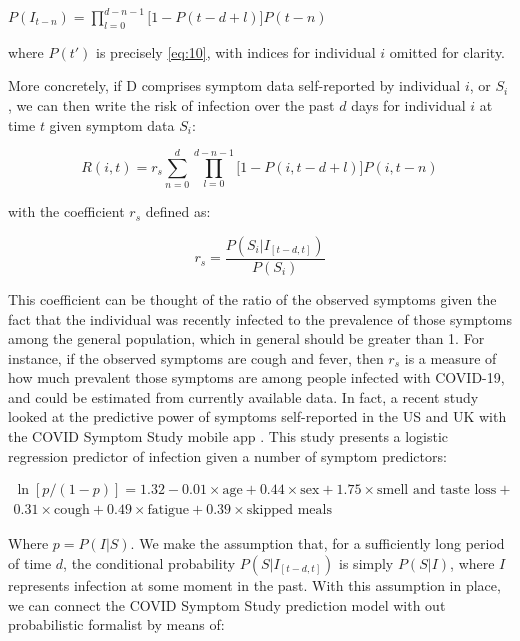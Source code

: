 \documentclass{article}
\begin{document}
\begin{center}
$P(I_{t-n})=\prod\limits_{l=0}^{d-n-1}\big[1-P(t-d+l)\big]P(t-n)$
\end{center}

where $P(t')$ is precisely \eqref{eq:10}, with indices for individual $i$ omitted for clarity.

More concretely, if D comprises symptom data self-reported by individual $i$, or $S_i$, we can then write the risk of infection over the past $d$ days for individual $i$ at time $t$ given symptom data $S_i$:

\begin{equation}
R(i, t)=r_s\sum\limits_{n=0}^{d}\prod\limits_{l=0}^{d-n-1}\big[1-P(i, t-d+l)\big]P(i, t-n)
\label{eq:13}
\end{equation}

with the coefficient $r_s$ defined as:

\begin{equation}
r_s=\frac{P(S_i|I_{[t-d, t]})}{P(S_i)}
\end{equation}

This coefficient can be thought of the ratio of the observed symptoms given the fact that the individual was recently infected to the prevalence of those symptoms among the general population, which in general should be greater than 1. For instance, if the observed symptoms are cough and fever, then $r_s$ is a measure of how much prevalent those symptoms are among people infected with COVID-19, and could be estimated from currently available data. In fact, a recent study \cite{Menni2020} looked at the predictive power of symptoms self-reported in the US and UK with the COVID Symptom Study mobile app \cite{COVIDSymptomStudy}. This study presents a logistic regression predictor of infection given a number of symptom predictors:

\begin{equation}
\begin{split}
\ln[p/(1-p)]=1.32 - 0.01 \times \mbox{age} + 0.44 \times \mbox{sex} + 1.75 \times \mbox{smell and taste loss} + \\
0.31 \times \mbox{cough} + 0.49 \times \mbox{fatigue} + 0.39 \times \mbox{skipped meals}
\end{split}
\end{equation}

Where $p=P(I|S)$. We make the assumption that, for a sufficiently long period of time $d$, the conditional probability $P(S|I_{[t-d, t]})$ is simply $P(S|I)$, where $I$ represents infection at some moment in the past. With this assumption in place, we can connect the COVID Symptom Study prediction model with out probabilistic formalist by means of:
\end{document}
